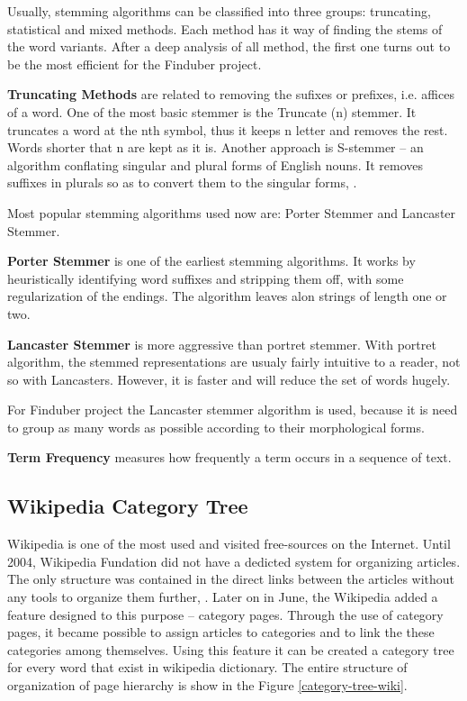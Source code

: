 Usually, stemming algorithms can be classified into three groups: truncating, statistical and mixed methods. Each method has it way of finding the stems of the word variants. After a deep analysis of all method, the first one turns out to be the most efficient for the Finduber project. 

\textbf{Truncating Methods} are related to removing the sufixes or prefixes, i.e. affices of a word. One of the most basic stemmer is the Truncate (n) stemmer. It truncates a word at the nth symbol, thus it keeps n letter and removes the rest. Words shorter that n are kept as it is. Another approach is S-stemmer -- an algorithm conflating singular and plural forms of English nouns. It removes suffixes in plurals so as to convert them to the singular forms, \cite{truncat-stemm}.

Most popular stemming algorithms used now are: Porter Stemmer and Lancaster Stemmer.

\textbf{Porter Stemmer} is one of the earliest stemming algorithms. It works by heuristically identifying word suffixes and stripping them off, with some regularization of the endings. The algorithm leaves alon strings of length one or two. 

\textbf{Lancaster Stemmer} is more aggressive than portret stemmer. With portret algorithm, the stemmed representations are usualy fairly intuitive to a reader, not so with Lancasters. However, it is faster and will reduce the set of words hugely. 

For Finduber project the Lancaster stemmer algorithm is used, because it is need to group as many words as possible according to their morphological forms.

\textbf{Term Frequency} measures how frequently a term occurs in a sequence of text.

\subsection{Wikipedia Category Tree}

Wikipedia is one of the most used and visited free-sources on the Internet. Until 2004, Wikipedia Fundation did not have a dedicted system for organizing articles. The only structure was contained in the direct links between the articles without any tools to organize them further, \cite{wikicategory}. Later on in June, the Wikipedia added a feature designed to this purpose -- category pages. Through the use of category pages, it became possible to assign articles to categories and to link the these categories among themselves. Using this feature it can be created a category tree for every word that exist in wikipedia dictionary. The entire structure of organization of page hierarchy is show in the Figure \ref{category-tree-wiki}. 

